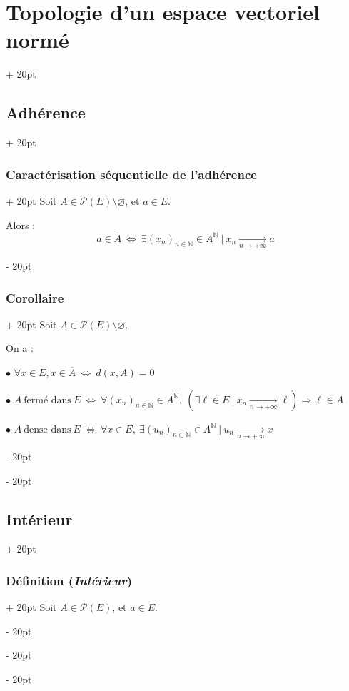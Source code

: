 \documentclass[a4paper, 12pt, twoside]{article}
\newcommand{\N}{\mathbb{N}} %
\newcommand{\cj}[1]{\overline{#1}} %
\newcommand{\tendsto}[1]{\xrightarrow[#1]{}}
\newcommand{\ssi}{\ \Leftrightarrow \ }
\newcommand{\ind}[1][20pt]{\advance\leftskip + #1}
\newcommand{\deind}[1][20pt]{\advance\leftskip - #1}
\newenvironment{indt}[2][20pt]{#2 \par \ind[#1]}{\par \deind} %
\begin{document}
\begin{indt}{\section{Topologie d'un espace vectoriel normé}}
\begin{indt}{\subsection{Adhérence}}
            \vspace{12pt}
            
            \begin{indt}{\subsubsection{Caractérisation séquentielle de l'adhérence}}
                Soit $A \in \mathcal P(E) \setminus \varnothing$, et $a \in E$.

                Alors :
                \[
                    a \in \cj A
                    \ssi
                    \exists (x_n)_{n \in \N} \in A^\N\ |\ x_n \tendsto{n \to +\infty} a
                \]
            \end{indt}

            \vspace{12pt}
            
            \begin{indt}{\subsubsection{Corollaire}}
                Soit $A \in \mathcal P(E) \setminus \varnothing$.

                On a :

                \vspace{6pt}
                
                $\bullet$ $\forall x \in E, x \in \cj A \ssi d(x, A) = 0$

                $\bullet$
                $
                    A\ \text{fermé dans}\ E
                    \ssi
                    \forall (x_n)_{n \in \N} \in A^\N,\
                    (\exists \ell \in E\ |\ x_n \tendsto{n \to +\infty} \ell) \Rightarrow \ell \in A
                $

                $\bullet$
                $
                    A\ \text{dense dans}\ E
                    \ssi
                    \forall x \in E,\
                    \exists (u_n)_{n \in \N} \in A^\N\ |\ u_n \tendsto{n \to +\infty} x
                $
            \end{indt}
        \end{indt}

        \vspace{12pt}
        
        \begin{indt}{\subsection{Intérieur}}
            \begin{indt}{\subsubsection{Définition (\textit{Intérieur})}}
                Soit $A \in \mathcal P(E)$, et $a \in E$.


\end{indt}
\end{indt}
\end{indt}
\end{document}

